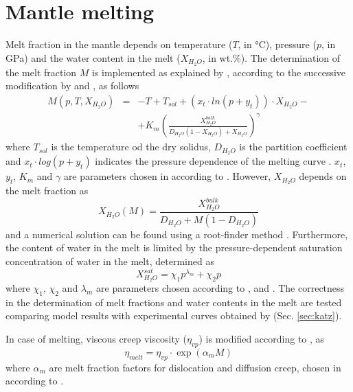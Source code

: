 \documentclass[hidelinks,11pt,a4paper]{article}
\begin{document}
\section{Mantle melting}\label{sec:melt}
Melt fraction in the mantle depends on temperature ($T$, in °C), pressure ($p$, in \si{\giga\pascal}) and the water content in the melt ($X_{H_2O}$, in wt.\%). The determination of the melt fraction $M$ is implemented as explained by \citet{Katz2003}, according to the successive modification by \citet{Langmuir2006} and \citet{Kelley2010}, as follows
\begin{eqnarray}\label{eq:melt_fr}
M(p,T,X_{H_2O})&=&-T+T_{sol}+(x_t\cdot ln(p+y_t))\cdot X_{H_2O}-\nonumber\\
&&+K_m\left(\frac{X_{H_2O}^{bulk}}{D_{H_2O}(1-X_{H_2O})+X_{H_2O}}\right)^{\gamma}
\end{eqnarray}
where $T_{sol}$ is the temperature od the dry solidus, $D_{H_2O}$ is the partition coefficient and $x_t\cdot log(p+y_t)$ indicates the pressure dependence of the melting curve \citep{Kelley2010}. $x_t$, $y_t$, $K_m$ and $\gamma$ are parameters chosen in according to \citet{Kelley2010}.
However, $X_{H_2O}$ depends on the melt fraction as
\begin{equation}\label{eq:melt_wt}
X_{H_2O}(M)=\frac{X_{H_2O}^{bulk}}{D_{H_2O}+M(1-D_{H_2O})}
\end{equation}
and a numerical solution can be found using a root-finder method \citep{Katz2003,Wang2016}. Furthermore, the content of water in the melt is limited by the pressure-dependent saturation concentration of water in the melt, determined as
\begin{equation}\label{eq:melt_max}
X_{H_2O}^{sat}=\chi_1 p^{\lambda_m}+\chi_2 p
\end{equation}
where $\chi_1$, $\chi_2$ and $\lambda_m$ are parameters chosen according to \citet{Katz2003}, \citet{Langmuir2006} and \citet{Kelley2010}. The correctness in the determination of melt fractions and water contents in the melt are tested comparing model results with experimental curves obtained by \citet{Katz2003} (Sec. \ref{sec:katz}).

In case of melting, viscous creep viscosity ($\eta_{vp}$) is modified according to \citet{Wang2016}, as
\begin{equation}\label{eq:melt_visc}
\eta_{melt}=\eta_{vp}\cdot \exp(\alpha_m M)
\end{equation}
where $\alpha_m$ are melt fraction factors for dislocation and diffusion creep, chosen in according to \citet{Wang2016}.
\end{document}

